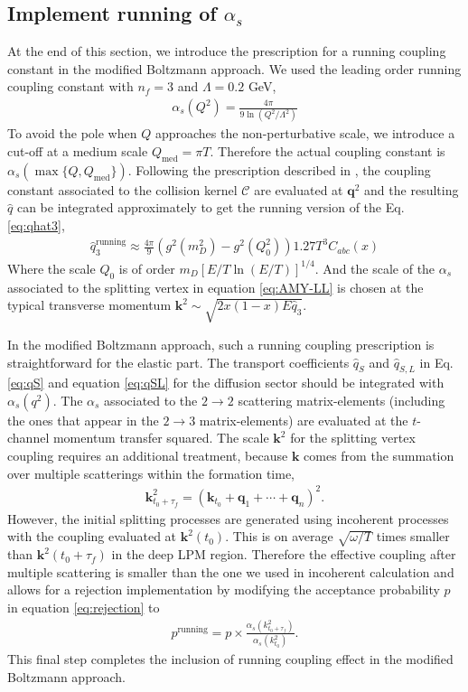 \documentclass[aps, prc, reprint, amsmath, groupedaddress, nofootinbib]{revtex4-1}
\begin{document}
\subsection{Implement running of $\alpha_s$}\label{section:running}
At the end of this section, we introduce the prescription for a running coupling constant in the modified Boltzmann approach.
We used the leading order running coupling constant with $n_f = 3$ and $\Lambda = 0.2$ GeV, 
\begin{eqnarray}
\alpha_s(Q^2) = \frac{4\pi}{9\ln\left(Q^2/\Lambda^2\right)}
\end{eqnarray}
To avoid the pole when $Q$ approaches the non-perturbative scale, we introduce a cut-off at a medium scale $Q_{\textrm{med}} = \pi T$. 
Therefore the actual coupling constant is $\alpha_s(\max\{Q, Q_{\textrm{med}}\})$.
Following the prescription described in \cite{Arnold:2008zu}, the coupling constant associated to the collision kernel $\mathcal{C}$ are evaluated at $\mathbf{q}^2$ and the resulting $\hat{q}$ can be integrated approximately to get the running version of the Eq. \ref{eq:qhat3},
\begin{eqnarray}
\hat{q}_3^{\textrm{running}} \approx \frac{4\pi}{9}\left(g^2(m_D^2) - g^2(Q_0^2)\right) 1.27 T^3 C_{abc}(x)
\label{eq:q3running}
\end{eqnarray}
Where the scale $Q_0$ is of order $m_D [E/T \ln(E/T)]^{1/4}$.
And the scale of the $\alpha_s$ associated to the splitting  vertex in equation \ref{eq:AMY-LL} is chosen at the typical transverse momentum $\mathbf{k}^2 \sim \sqrt{2x(1-x)E\hat{q}_3}$.

In the modified Boltzmann approach, such a running coupling prescription is straightforward for the elastic part.
The transport coefficients $\hat{q}_S$ and $\hat{q}_{S, L}$ in Eq. \ref{eq:qS} and equation \ref{eq:qSL} for the diffusion sector should be integrated with $\alpha_s(q^2)$.
The $\alpha_s$ associated to the $2\rightarrow 2$ scattering matrix-elements (including the ones that appear in the $2\rightarrow 3$ matrix-elements) are evaluated at the $t$-channel momentum transfer squared.
The scale $\mathbf{k}^2$ for the splitting vertex coupling requires an additional treatment, because $\mathbf{k}$ comes from the summation over multiple scatterings within the formation time,
\begin{eqnarray}\label{eq:kTn}
\mathbf{k}_{t_0+\tau_f}^2 = \left(\mathbf{k}_{t_0}+\mathbf{q}_1+\cdots+\mathbf{q}_n\right)^2.
\end{eqnarray} 
However, the initial splitting processes are generated using incoherent processes with the coupling evaluated at $\mathbf{k}^2(t_0)$.
This is on average $\sqrt{\omega/T}$ times smaller than $\mathbf{k}^2(t_0+\tau_f)$ in the deep LPM region.
Therefore the effective coupling after multiple scattering is smaller than the one we used in incoherent calculation and allows for a rejection implementation by modifying the acceptance probability $p$ in equation \ref{eq:rejection} to
\begin{eqnarray}
p^{\textrm{running}} = p\times \frac{\alpha_s(k_{t_0+\tau_f}^2)}{\alpha_s(k_{t_0}^2)}.
\end{eqnarray}
This final step completes the inclusion of running coupling effect in the modified Boltzmann approach.
\end{document}
